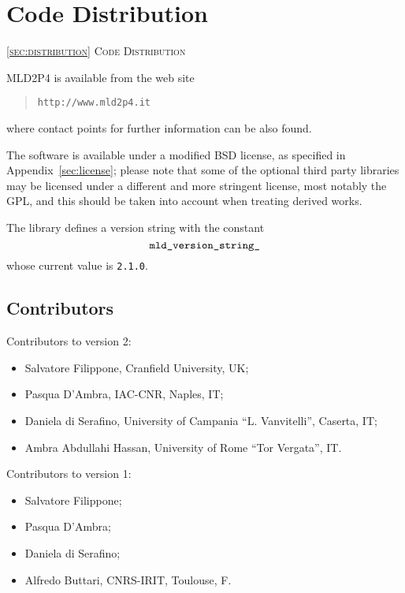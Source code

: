 \section{Code Distribution\label{sec:distribution}}
         {\textsc{\ref{sec:distribution} Code Distribution}}

\noindent
MLD2P4 is available from the web site 
\begin{quotation}
\texttt{http://www.mld2p4.it}
\end{quotation}
where contact points for further information can be also found.

The software is available under a modified BSD license, as specified
in Appendix~\ref{sec:license}; please note that some of the optional
third party libraries may be licensed under a different and more
stringent license, most notably the GPL, and this should be taken into
account when treating derived works. 

The library defines a version string with the
constant 
\[ \verb|mld_version_string_|\]
whose current value is \verb|2.1.0|.

\subsection*{Contributors}
Contributors to version 2:
\begin{itemize}
\item Salvatore  Filippone,          Cranfield University, UK;				
\item Pasqua     D'Ambra,            IAC-CNR, Naples, IT;				
\item Daniela    di Serafino,        University of Campania ``L. Vanvitelli'', Caserta, IT;
\item Ambra	 Abdullahi Hassan, University of Rome ``Tor Vergata'', IT.
\end{itemize}
Contributors to version 1:
\begin{itemize}
\item Salvatore  Filippone;
\item Pasqua     D'Ambra;
\item Daniela    di Serafino;
\item Alfredo    Buttari, CNRS-IRIT, Toulouse, F. 
\end{itemize}
